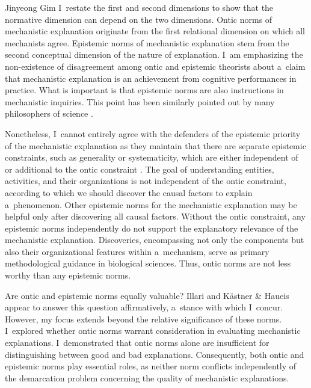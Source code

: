 \begin{artengenv}{Jinyeong Gim}
I~restate the first and second dimensions to show that the normative dimension can depend on the two dimensions. Ontic norms of mechanistic explanation originate from the first relational dimension on which all mechanists agree. Epistemic norms of mechanistic explanation stem from the second conceptual dimension of the nature of explanation. I~am emphasizing the non-existence of disagreement among ontic and epistemic theorists about a~claim that mechanistic explanation is an achievement from cognitive performances in practice. What is important is that epistemic norms are also instructions in mechanistic inquiries. This point has been similarly pointed out by many philosophers of science
\parencites[][]{illari_mechanistic_2013}[][]{van_eck_reconciling_2015}[][]{sheredos_re-reconciling_2016}[][]{kastner_discovering_2021}.%


Nonetheless, I~cannot entirely agree with the defenders of the epistemic priority of the mechanistic explanation as they maintain that there are separate epistemic constraints, such as generality or systematicity, which are either independent of or additional to the ontic constraint
\parencites[][]{van_eck_reconciling_2015}[][]{sheredos_re-reconciling_2016}. %
 The goal of understanding entities, activities, and their organizations is not independent of the ontic constraint, according to which we should discover the causal factors to explain a~phenomenon. Other epistemic norms for the mechanistic explanation may be helpful only after discovering all causal factors. Without the ontic constraint, any epistemic norms independently do not support the explanatory relevance of the mechanistic explanation. Discoveries, encompassing not only the components but also their organizational features within a~mechanism, serve as primary methodological guidance in biological sciences. Thus, ontic norms are not less worthy than any epistemic norms.

Are ontic and epistemic norms equally valuable? Illari
\parencite*[][]{illari_mechanistic_2013} %
 and Kästner \& Haueis 
\parencite*[][]{kastner_discovering_2021} %
 appear to answer this question affirmatively, a~stance with which I~concur. However, my focus extends beyond the relative significance of these norms. I~explored whether ontic norms warrant consideration in evaluating mechanistic explanations. I~demonstrated that ontic norms alone are insufficient for distinguishing between good and bad explanations. Consequently, both ontic and epistemic norms play essential roles, as neither norm conflicts independently of the demarcation problem concerning the quality of mechanistic explanations.


\end{artengenv}
